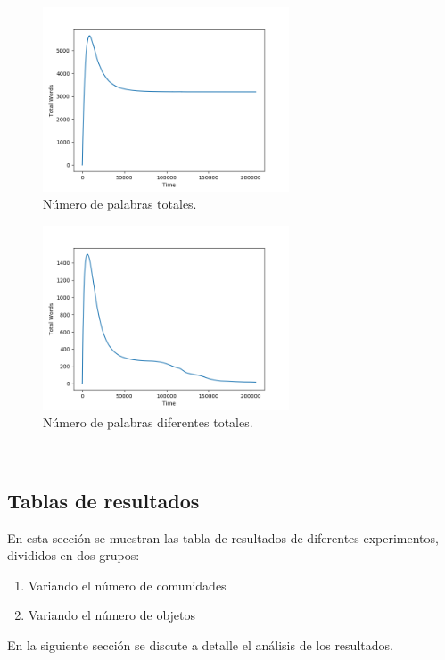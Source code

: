 \documentclass[runningheads]{llncs}
\begin{document}
\begin{figure}[H]
	\centering
	\includegraphics[width=0.65\textwidth]{Figure_333_TotalWords.png}
	\caption{Número de palabras totales.}
	\label{fig_006}
\end{figure}
\begin{figure}[H]
	\centering
	\includegraphics[width=0.65\textwidth]{Figure_333_TotalDifferentWords.png}
	\caption{Número de palabras diferentes totales.}
	\label{fig_007}
\end{figure}
\\
\subsection{Tablas de resultados}

En esta sección se muestran las tabla de resultados de diferentes experimentos, divididos en dos grupos:

\begin{enumerate}
	\item Variando el número de comunidades
	\item Variando el número de objetos
\end{enumerate}

En la siguiente sección se discute a detalle el análisis de los resultados.
\end{document}
